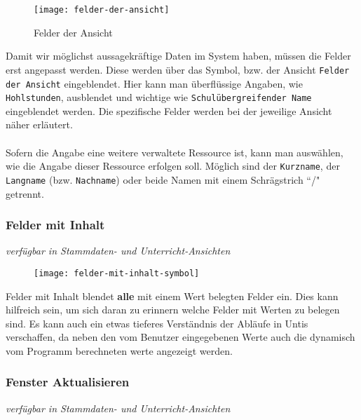 \begin{wrapfigure}{r}{0.4\textwidth}
	\texttt{[image: felder-der-ansicht]}
	\vspace{-15pt}
	\caption{Felder der Ansicht}
	\label{fig:felder-der-ansicht}
	\vspace{10pt}
\end{wrapfigure}

\noindent
Damit wir möglichst aussagekräftige Daten im System haben, müssen die Felder erst angepasst werden. Diese werden über das Symbol, bzw. der Ansicht \texttt{Felder der Ansicht} eingeblendet. Hier kann man überflüssige Angaben, wie \texttt{Hohlstunden}, ausblendet und wichtige wie \texttt{Schulübergreifender Name} eingeblendet werden. Die spezifische Felder werden bei der jeweilige Ansicht näher erläutert.\\
\\
Sofern die Angabe eine weitere verwaltete Ressource ist, kann man auswählen, wie die Angabe dieser Ressource erfolgen soll. Möglich sind der \texttt{Kurzname}, der \texttt{Langname} (bzw. \texttt{Nachname}) oder beide Namen mit einem Schrägstrich ``/" getrennt.\\

\subsubsection{Felder mit Inhalt}
{\small\textit{verfügbar in Stammdaten- und Unterricht-Ansichten\\}\par}

\begin{wrapfigure}{r}{.05\textwidth}
	\vspace{-50pt}
	\texttt{[image: felder-mit-inhalt-symbol]}
	\vspace{-35pt}
\end{wrapfigure}

\noindent
Felder mit Inhalt blendet \textbf{alle} mit einem Wert belegten Felder ein. Dies kann hilfreich sein, um sich daran zu erinnern welche Felder mit Werten zu belegen sind. Es kann auch ein etwas tieferes Verständnis der Abläufe in Untis verschaffen, da neben den vom Benutzer eingegebenen Werte auch die dynamisch vom Programm berechneten werte angezeigt werden.\\

\subsubsection{Fenster Aktualisieren}
{\small\textit{verfügbar in Stammdaten- und Unterricht-Ansichten\\}\par}

